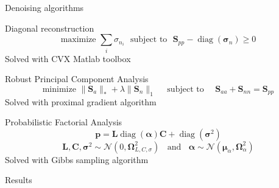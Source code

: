 \documentclass[10pt,xcolor=x11names,compress, notes=show]{beamer}%
\begin{document}
\begin{frame}{Denoising algorithms}

\begin{block}{Diagonal reconstruction}
\begin{equation*}
    \text{maximize~} \sum_i \sigma_{n_i} \text{~~subject to~~} \bm{S}_{pp}-\operatorname{diag}(\bm{\sigma}_n)\geq 0
\end{equation*}
Solved with CVX Matlab toolbox
\end{block}

\begin{block}{Robust Principal Component Analysis}
\begin{equation*}
	\text{minimize~} \|\bm{{S}}_{a} \|_* + \lambda \| \bm{{S}}_{n} \|_1  \text{~~~~subject to~~~~}  \bm{{S}}_{aa} +  \bm{{S}}_{nn} = \bm{S}_{pp}
\end{equation*}
Solved with proximal gradient algorithm 
\end{block}

\begin{block}{Probabilistic Factorial Analysis}
\begin{equation*}
        \bm{p} = \bm{L}\operatorname{diag}(\bm{\alpha})\bm{C} +\operatorname{diag}(\bm{\sigma}^2)
\end{equation*}
\begin{equation*}
   \bm{L},\bm{C},\bm{\sigma}^2\sim \mathcal{N}(0,\bm{\Omega}_{L,C,\sigma}^2)~~~~\text{and}~~~~\bm{\alpha}\sim \mathcal{N}(\bm{\mu}_{\alpha},\bm{\Omega}_{\alpha}^2)
\end{equation*}
Solved with Gibbs sampling algorithm
\end{block}
\end{frame}

\begin{frame}{Results}

\end{frame}

\begin{frame}
 
% 
% 
\end{frame}
\end{document}

